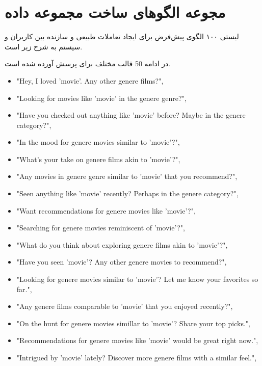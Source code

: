 
\chapter{مجوعه الگوهای ساخت مجموعه داده}
\label{app:naturalDiscussionTemplate}

\thispagestyle{empty}



لیستی ۱۰۰ الگوی پیش‌فرض برای ایجاد تعاملات طبیعی و سازنده بین کاربران و سیستم  به شرح زیر است.

در ادامه 50 قالب مختلف برای پرسش آورده شده است.

\begin{LTR}
\begin{itemize}
\item    
"Hey, I loved '{movie}'. Any other {genere} films?",
\item
"Looking for movies like '{movie}' in the {genere} genre?",
\item
"Have you checked out anything like '{movie}' before? Maybe in the {genere} category?",
\item
"In the mood for {genere} movies similar to '{movie}'?",
\item
"What's your take on {genere} films akin to '{movie}'?",
\item
"Any movies in {genere} genre similar to '{movie}' that you recommend?",
\item
"Seen anything like '{movie}' recently? Perhaps in the {genere} category?",
\item
"Want recommendations for {genere} movies like '{movie}'?",
\item
"Searching for {genere} movies reminiscent of '{movie}'?",
\item
"What do you think about exploring {genere} films akin to '{movie}'?",
\item
"Have you seen '{movie}'? Any other {genere} movies to recommend?",
\item
"Looking for {genere} movies similar to '{movie}'? Let me know your favorites so far.",
\item
"Any {genere} films comparable to '{movie}' that you enjoyed recently?",
\item
"On the hunt for {genere} movies simillar to '{movie}'? Share your top picks.",
\item
"Recommendations for {genere} movies like '{movie}' would be great right now.",
\item
"Intrigued by '{movie}' lately? Discover more {genere} films with a similar feel.",

\end{itemize}
\end{LTR}
